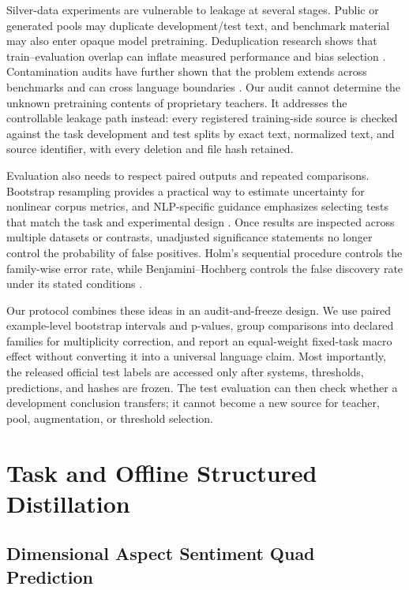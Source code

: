 Silver-data experiments are vulnerable to leakage at several stages.
Public or generated pools may duplicate development/test text, and
benchmark material may also enter opaque model pretraining.
Deduplication research shows that train--evaluation overlap can inflate
measured performance and bias selection \citep{lee2022deduplicating}.
Contamination audits have further shown that the problem extends across
benchmarks and can cross language boundaries
\citep{sainz2024contamination,yao2024crosslingual}. Our audit cannot
determine the unknown pretraining contents of proprietary teachers. It
addresses the controllable leakage path instead: every registered
training-side source is checked against the task development and test
splits by exact text, normalized text, and source identifier, with every
deletion and file hash retained.

Evaluation also needs to respect paired outputs and repeated
comparisons. Bootstrap resampling provides a practical way to estimate
uncertainty for nonlinear corpus metrics, and NLP-specific guidance
emphasizes selecting tests that match the task and experimental design
\citep{koehn2004statistical,dror2018hitchhiker}. Once results are
inspected across multiple datasets or contrasts, unadjusted significance
statements no longer control the probability of false positives. Holm's
sequential procedure controls the family-wise error rate, while
Benjamini--Hochberg controls the false discovery rate under its stated
conditions \citep{holm1979,benjamini1995}.

Our protocol combines these ideas in an audit-and-freeze design. We use
paired example-level bootstrap intervals and p-values, group comparisons
into declared families for multiplicity correction, and report an
equal-weight fixed-task macro effect without converting it into a
universal language claim. Most importantly, the released official test
labels are accessed only after systems, thresholds, predictions, and
hashes are frozen. The test evaluation can then check whether a
development conclusion transfers; it cannot become a new source for
teacher, pool, augmentation, or threshold selection.

\section{Task and Offline Structured
Distillation}\label{task-and-offline-structured-distillation}

\subsection{Dimensional Aspect Sentiment Quad
Prediction}\label{dimensional-aspect-sentiment-quad-prediction}

